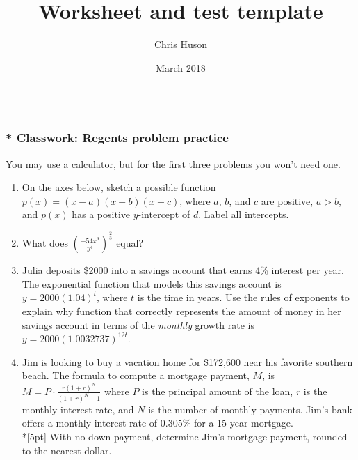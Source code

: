 \documentclass[12pt, oneside]{article}
\title{Worksheet and test template}
\author{Chris Huson}
\date{March 2018}
\begin{document}
\subsubsection*{\\* Classwork: Regents problem practice}
You may use a calculator, but for the first three problems you won't need one.

\begin{enumerate}

  \item On the axes below, sketch a possible function $p(x) = (x  -a)(x - b)(x + c)$, where $a$, $b$, and $c$ are positive, $a  >b$, and $p(x)$ has a positive $y$-intercept of $d$. Label all intercepts.
  \begin{center}
  \end{center} %

  \item What does $\displaystyle \left( \frac{-54x^9}{y^4} \right)^\frac{2}{3}$ equal? %

\newpage

  \item Julia deposits \$2000 into a savings account that earns 4\% interest per year. The exponential function that models this savings account
  is $y=2000(1.04)^t$, where $t$ is the time in years. Use the rules of exponents to explain why function that correctly represents the amount of money in her savings account in terms of the \emph{monthly} growth rate is $y=2000(1.0032737)^{12t}$. \vspace{4cm}

  \item Jim is looking to buy a vacation home for \$172,600 near his favorite southern beach. The formula to compute a mortgage payment, $M$, is $\displaystyle M=P \cdot \frac{r(1+r)^N}{(1+r)^N-1}$ where $P$ is the principal amount of the loan, $r$ is the monthly interest rate, and $N$ is the number of monthly payments. Jim’s bank offers a monthly interest rate of 0.305\% for a 15-year mortgage.\\*[5pt]
  With no down payment, determine Jim’s mortgage payment, rounded to the nearest dollar. \vspace{4cm}


\end{enumerate}
\end{document}
